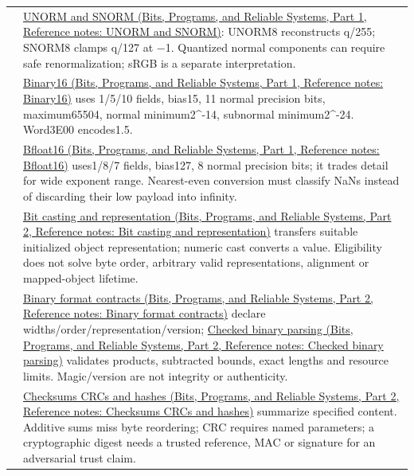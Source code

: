 {\begin{longtable}[]{@{}
  >{\raggedright\arraybackslash}p{}
  >{\raggedright\arraybackslash}p{}@{}}
94 & \href{../01-Bits-Programs-and-Reliable-Systems-P01/main.pdf\#nameddest=appendix-b2402c453dac}{UNORM and SNORM (Bits, Programs, and Reliable Systems, Part 1, Reference notes: UNORM and SNORM)}: UNORM8 reconstructs q/255; SNORM8 clamps q/127 at −1. Quantized normal components can require safe renormalization; sRGB is a separate interpretation. \\
95 & \href{../01-Bits-Programs-and-Reliable-Systems-P01/main.pdf\#nameddest=appendix-34443cec7170}{Binary16 (Bits, Programs, and Reliable Systems, Part 1, Reference notes: Binary16)} uses 1/5/10 fields, bias15, 11 normal precision bits, maximum65504, normal minimum2\^{}-14, subnormal minimum2\^{}-24. Word3E00 encodes1.5. \\
96 & \href{../01-Bits-Programs-and-Reliable-Systems-P01/main.pdf\#nameddest=appendix-18b8dd966b5d}{Bfloat16 (Bits, Programs, and Reliable Systems, Part 1, Reference notes: Bfloat16)} uses1/8/7 fields, bias127, 8 normal precision bits; it trades detail for wide exponent range. Nearest-even conversion must classify NaNs instead of discarding their low payload into infinity. \\
97 & \href{../01-Bits-Programs-and-Reliable-Systems-P02/main.pdf\#nameddest=appendix-34ee45f161c1}{Bit casting and representation (Bits, Programs, and Reliable Systems, Part 2, Reference notes: Bit casting and representation)} transfers suitable initialized object representation; numeric cast converts a value. Eligibility does not solve byte order, arbitrary valid representations, alignment or mapped-object lifetime. \\
98 & \href{../01-Bits-Programs-and-Reliable-Systems-P02/main.pdf\#nameddest=appendix-590bbb2424c1}{Binary format contracts (Bits, Programs, and Reliable Systems, Part 2, Reference notes: Binary format contracts)} declare widths/order/representation/version; \href{../01-Bits-Programs-and-Reliable-Systems-P02/main.pdf\#nameddest=appendix-652d81568de9}{Checked binary parsing (Bits, Programs, and Reliable Systems, Part 2, Reference notes: Checked binary parsing)} validates products, subtracted bounds, exact lengths and resource limits. Magic/version are not integrity or authenticity. \\
99 & \href{../01-Bits-Programs-and-Reliable-Systems-P02/main.pdf\#nameddest=appendix-ed338677de0a}{Checksums CRCs and hashes (Bits, Programs, and Reliable Systems, Part 2, Reference notes: Checksums CRCs and hashes)} summarize specified content. Additive sums miss byte reordering; CRC requires named parameters; a cryptographic digest needs a trusted reference, MAC or signature for an adversarial trust claim. \\

\end{longtable}}
